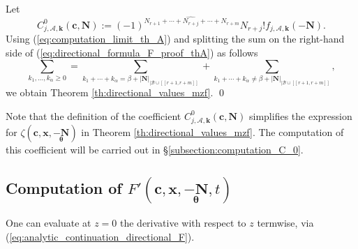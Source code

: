 \documentclass[a4paper]{amsart}
\theoremstyle{remark}
\theoremstyle{definition}
\begin{document}
Let 
\begin{equation}
    C^0_{j,\mathcal{A},\mathbf{k}}(\mathbf{c},\mathbf{N}) := (-1)^{N_{r+1}+\cdots+\widehat{N_{r+j}}+\cdots+N_{r+m}} N_{r+j}! f_{j,\mathcal{A},\mathbf{k}}(-\mathbf{N}). \label{eq:def_C_0}
\end{equation}
Using (\ref{eq:computation_limit_th_A}) and splitting the sum on the right-hand side of (\ref{eq:directional_formula_F_proof_thA}) as follows 
$$ \sum_{k_1,\ldots,k_{\alpha} \geq 0} = \sum_{k_1+\cdots+k_{\alpha} = \beta+|\mathbf{N}|_{|\mathcal{B}\cup [\![ r+1,r+m ]\!]}} + \sum_{k_1+\cdots+k_{\alpha} \neq \beta+|\mathbf{N}|_{|\mathcal{B}\cup [\![ r+1,r+m ]\!]}}, $$
we obtain Theorem \ref{th:directional_values_mzf}. \qed

Note that the definition of the coefficient $C^0_{j,\mathcal{A},\mathbf{k}}(\mathbf{c},\mathbf{N})$ simplifies the expression for $\zeta(\mathbf{c},\mathbf{x},\underset{\bm{\theta}}{-\mathbf{N}})$ in Theorem \ref{th:directional_values_mzf}. The computation of this coefficient will be carried out in §\ref{subsection:computation_C_0}.

\subsection{Computation of \texorpdfstring{$F'(\mathbf{c},\mathbf{x},\underset{\bm{\theta}}{-\mathbf{N}},t)$}{directionalderivativef}}
\label{subsection:computation_F_prime}

One can evaluate at $z=0$ the derivative with respect to $z$ termwise, via (\ref{eq:analytic_continuation_directional_F}).
\end{document}
